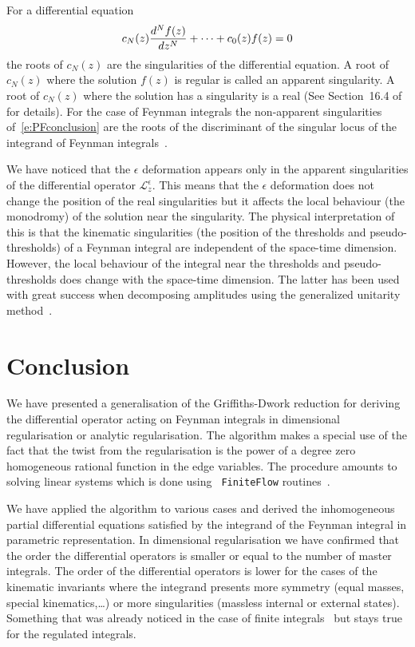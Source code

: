 \documentclass[a4paper,12pt]{article}
\numberwithin{equation}{section}
\numberwithin{figure}{section}
\begin{document}
%
For a differential equation
\begin{equation}\label{e:PFconclusion}
c_N(z)  {d^Nf(z)\over dz^N}+\cdots + c_0(z) f(z)=0
\end{equation}
the roots of $c_N(z)$ are the singularities of the differential
equation. A root of $c_N(z)$ where the solution $f(z)$ is
regular is called an apparent singularity. A root of $c_N(z)$
where the solution has a singularity is a real (See 
Section~16.4 of~\cite{Ince} for details). 
%
For the case of Feynman integrals the non-apparent singularities
of~\eqref{e:PFconclusion} are the roots of the
discriminant of the singular locus of the integrand of  Feynman
integrals~\cite{Doran:2023yzu}.

We have noticed that the $\epsilon$ deformation appears only in  the
apparent singularities of the differential operator
$\mathscr{L}_z^\epsilon$. This means that the  $\epsilon$ deformation
does not change the position of the real singularities but it affects
the local behaviour (the monodromy) of the solution near the
singularity.
%
The physical interpretation of this is that the kinematic
singularities (the position of the thresholds
and pseudo-thresholds) of a Feynman integral are independent of the
space-time dimension. However,  the local behaviour of the integral near
the thresholds and pseudo-thresholds does change with the space-time
dimension. The latter has been used with great success
when decomposing amplitudes using the generalized unitarity method~\cite{Bern:2011qt}.

\section{Conclusion}\label{sec:conclusion}
We have presented a generalisation of the Griffiths-Dwork reduction
for deriving the differential operator acting on Feynman integrals in
dimensional regularisation or analytic regularisation. The algorithm
makes a special use of the fact that the twist from the regularisation
is the power of a degree zero homogeneous rational function in the
edge variables. The procedure amounts to
solving linear systems which is done using {\tt
  FiniteFlow} routines~\cite{Peraro:2019svx}.

We have applied the algorithm to various cases and derived the
inhomogeneous partial differential equations satisfied by the integrand of the Feynman integral in parametric representation.
In dimensional regularisation we have confirmed that the order the
differential operators is smaller or equal to the number of master
integrals. The order of the differential operators is lower for the cases of the kinematic invariants where the integrand
presents more symmetry (equal masses, special kinematics,\dots) or
more singularities (massless internal or external states). Something
that was already noticed in the case of finite integrals~\cite{Lairez:2022zkj}  but stays
true for the regulated integrals.
\end{document}
